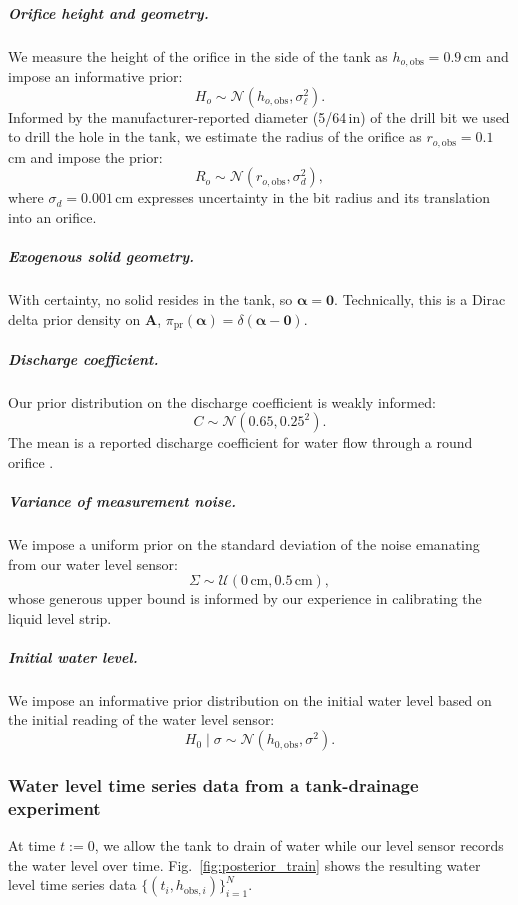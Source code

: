 \documentclass[a4paper,fleqn]{cas-dc}
\newcommand\thedata {$\{(t_i,h_{\text{obs}, i})\}_{i=1}^{N}$\xspace}
\begin{document}
\subparagraph{Orifice height and geometry.} 
We measure the height of the orifice in the side of the tank as $h_{o, \text{obs}}=0.9$\,cm and impose an informative prior:
\begin{equation}
H_o \sim \mathcal{N}(h_{o, \text{obs}}, \sigma_\ell^2).
\end{equation}
Informed by the manufacturer-reported diameter (5/64\,in) of the drill bit we used to drill the hole in the tank, we estimate the radius of the orifice as $r_{o, \text{obs}}=0.1$\,cm and impose the prior:
\begin{equation}
R_o \sim \mathcal{N}(r_{o, \text{obs}}, \sigma_d^2), \label{eq:R_o_prior}
\end{equation}
where $\sigma_d= 0.001$\,cm expresses uncertainty in the bit radius and its translation into an orifice.


\subparagraph{Exogenous solid geometry.}
With certainty, no solid resides in the tank, so $\boldsymbol \alpha=\mathbf{0}$. Technically, this is a Dirac delta prior density on $\mathbf{A}$, $\pi_{\text{pr}}(\boldsymbol \alpha)=\delta(\boldsymbol \alpha - \mathbf{0})$. 





\subparagraph{Discharge coefficient.} 
Our prior distribution on the discharge coefficient is weakly informed:
\begin{equation}
	C \sim \mathcal{N}(0.65, 0.25^2).
\end{equation} The mean is a reported discharge coefficient for water flow through a round orifice \cite{hicks2014determining}. 


\subparagraph{Variance of measurement noise.} 
We impose a uniform prior on the standard deviation of the noise emanating from our water level sensor:
\begin{equation}
\Sigma \sim \mathcal{U}(0\,\text{cm}, 0.5\,\text{cm}),
\end{equation} whose generous upper bound is informed by our experience in calibrating the liquid level strip. 


\subparagraph{Initial water level.} We impose an informative prior distribution on the initial water level based on the initial reading of the water level sensor:
\begin{equation}
	H_0 \mid \sigma \sim \mathcal{N}(h_{0, \text{obs}}, \sigma^2).
\end{equation} 


\subsubsection{Water level time series data from a tank-drainage experiment} At time $t:=0$, we allow the tank to drain of water while our level sensor records the water level over time. 
Fig.~\ref{fig:posterior_train} shows the resulting water level time series data \thedata.
\end{document}
